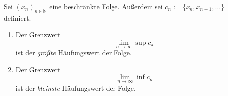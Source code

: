 Sei $(x_n)_{n \in \mathbb{N}}$ eine beschränkte Folge. Außerdem sei $c_n := \{x_n, x_{n+1}, \dots\}$ definiert.
\begin{enumerate}
    \item Der Grenzwert $$\lim_{n \to \infty} \sup c_n$$ ist der \textit{größte} Häufungswert der Folge.
    \item Der Grenzwert $$\lim_{n \to \infty} \inf c_n$$ ist der \textit{kleinste} Häufungswert der Folge.
\end{enumerate}